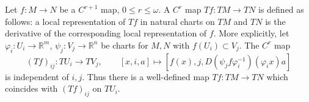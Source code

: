 Let $f: M \to N$ be a $C^{r+1}$ map, $0 \leqslant r \leqslant \omega$. A $C^r$ map $Tf: TM \to TN$ is defined as follows: a local representation of $Tf$ in natural charts on $TM$ and $TN$ is the derivative of the corresponding local representation of $f$. More explicitly, let $\varphi_i: U_i \to \mathbb{R}^m$, $\psi_j: V_j \to \mathbb{R}^n$ be charts for $M, N$ with $f(U_i) \subset V_j$. The $C^r$ map
$$(Tf)_{ij}: TU_i \to TV_j, \qquad [x,i,a] \mapsto [f(x), j, D(\psi_j f \varphi_i^{-1})(\varphi_i x)a]$$
is independent of $i, j$. Thus there is a well-defined map $Tf: TM \to TN$ which coincides with $(Tf)_{ij}$ on $TU_i$.
